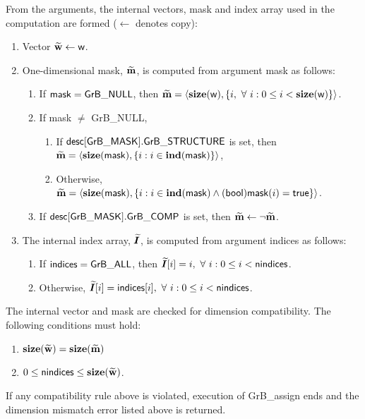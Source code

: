 From the arguments, the internal vectors, mask and index array used in 
the computation are formed ($\leftarrow$ denotes copy):
\begin{enumerate}
	\item Vector ${\bf \widetilde{w}} \leftarrow {\sf w}$.

	\item One-dimensional mask, ${\bf \widetilde{m}}$, is computed from 
    argument {\sf mask} as follows:
	\begin{enumerate}
		\item If ${\sf mask} = {\sf GrB\_NULL}$, then ${\bf \widetilde{m}} = 
        \langle \bold{size}({\sf w}), \{i, \ \forall \ i : 0 \leq i < 
        \bold{size}({\sf w}) \} \rangle$.

		\item If {\sf mask} $\ne$ {\sf GrB\_NULL},  
        \begin{enumerate}
            \item If ${\sf desc[GrB\_MASK].GrB\_STRUCTURE}$ is set, then
            ${\bf \widetilde{m}} = 
            \langle \bold{size}({\sf mask}), \{i : i \in \bold{ind}({\sf mask}) \} \rangle$,
            \item Otherwise, ${\bf \widetilde{m}} = 
            \langle \bold{size}({\sf mask}), \{i : i \in \bold{ind}({\sf mask}) \wedge
            ({\sf bool}){\sf mask}(i) = {\sf true} \} \rangle$.
        \end{enumerate}

		\item	If ${\sf desc[GrB\_MASK].GrB\_COMP}$ is set, then 
        ${\bf \widetilde{m}} \leftarrow \neg {\bf \widetilde{m}}$.
	\end{enumerate}

    \item The internal index array, $\bm{\widetilde{I}}$, is computed from 
    argument {\sf indices} as follows:
	\begin{enumerate}
		\item	If ${\sf indices} = {\sf GrB\_ALL}$, then 
        $\bm{\widetilde{I}}[i] = i, \ \forall \ i : 0 \leq i < {\sf nindices}$.

		\item	Otherwise, $\bm{\widetilde{I}}[i] = {\sf indices}[i], 
        \ \forall \ i : 0 \leq i < {\sf nindices}$.
    \end{enumerate}
\end{enumerate}

The internal vector and mask are checked for dimension compatibility. 
The following conditions must hold:
\begin{enumerate}
    \item $\bold{size}({\bf \widetilde{w}}) = \bold{size}({\bf \widetilde{m}})$
    \item $0 \leq {\sf nindices} \leq \bold{size}({\bf \widetilde{w}})$.
\end{enumerate}
If any compatibility rule above is violated, execution of {\sf GrB\_assign} ends and 
the dimension mismatch error listed above is returned.

